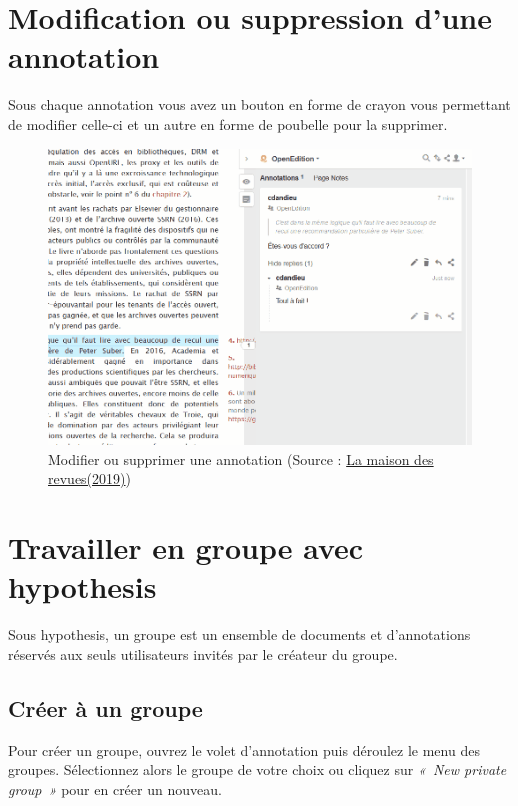 \documentclass[
]{book}
\begin{document}
\hypertarget{s5}{%
\chapter{Modification ou suppression d'une annotation}\label{s5}}

Sous chaque annotation vous avez un bouton en forme de crayon vous permettant de modifier celle-ci et un autre en forme de poubelle pour la supprimer.

\begin{figure}
\centering
\includegraphics{img/523575cc7eaccc9577140afd392b9710.png}
\caption{Modifier ou supprimer une annotation (Source : \href{http://www.maisondesrevues.org/1182}{La maison des revues(2019)})}
\end{figure}

\hypertarget{s6}{%
\chapter{Travailler en groupe avec hypothesis}\label{s6}}

Sous hypothesis, un groupe est un ensemble de documents et d'annotations réservés aux seuls utilisateurs invités par le créateur du groupe.

\hypertarget{s61}{%
\section{Créer à un groupe}\label{s61}}

Pour créer un groupe, ouvrez le volet d'annotation puis déroulez le menu des groupes. Sélectionnez alors le groupe de votre choix ou cliquez sur \emph{«~New private group~»} pour en créer un nouveau.
\end{document}
